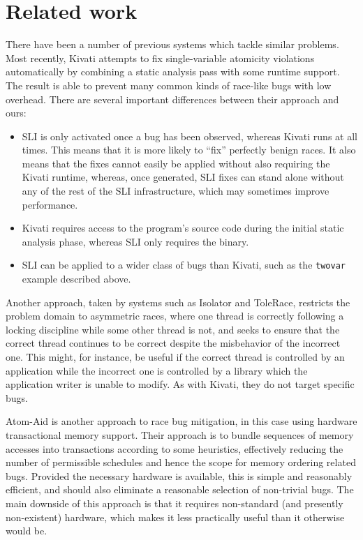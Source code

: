 \documentclass[10pt,twocolumn,preprint,natbib,authoryear]{sigplanconf}
\newcommand{\editorial}[1]{}
\begin{document}
\section{Related work}\editorial{This is a bit of a bestiary.  Could do with a bit more analysis.}

There have been a number of previous systems which tackle similar
problems.  Most recently, Kivati\cite{Chew2010a} attempts to fix
single-variable atomicity violations automatically by combining a
static analysis pass with some runtime support.  The result is able to
prevent many common kinds of race-like bugs with low overhead.  There
are several important differences between their approach and ours:

\begin{itemize}
\item SLI is only activated once a bug has been observed, whereas
  Kivati runs at all times.  This means that it is more likely to
  ``fix'' perfectly benign races.  It also means that the fixes cannot
  easily be applied without also requiring the Kivati runtime,
  whereas, once generated, SLI fixes can stand alone without any of
  the rest of the SLI infrastructure, which may sometimes improve
  performance.
\item Kivati requires access to the program's source code during the
  initial static analysis phase, whereas SLI only requires the binary.
\item SLI can be applied to a wider class of bugs than Kivati, such as
  the \verb|twovar| example described above.
\end{itemize}

Another approach, taken by systems such as
Isolator\cite{Ramalingam2009} and ToleRace\cite{Kirovski2007},
restricts the problem domain to asymmetric races, where one thread is
correctly following a locking discipline while some other thread is
not, and seeks to ensure that the correct thread continues to be
correct despite the misbehavior of the incorrect one.  This might,
for instance, be useful if the correct thread is controlled by an
application while the incorrect one is controlled by a library which
the application writer is unable to modify.  As with Kivati, they do
not target specific bugs.

Atom-Aid\cite{Lucia2009} is another approach to race bug
mitigation, in this case using hardware transactional memory support.
Their approach is to bundle sequences of memory accesses into
transactions according to some heuristics, effectively reducing the
number of permissible schedules and hence the scope for memory
ordering related bugs.  Provided the necessary hardware is available,
this is simple and reasonably efficient, and should also eliminate a
reasonable selection of non-trivial bugs.  The main downside of this
approach is that it requires non-standard (and presently non-existent)
hardware, which makes it less practically useful than it otherwise
would be.
\end{document}
